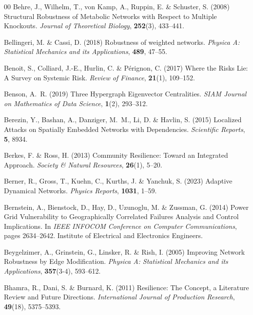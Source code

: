 \documentclass{comnet-mod}
\begin{document}
\begin{thebibliography}{00}
Behre, J., Wilhelm, T., {von Kamp}, A., Ruppin, E. {\&} Schuster, S. (2008)
  {Structural Robustness of Metabolic Networks with Respect to Multiple
  Knockouts}. {\em {Journal of Theoretical Biology}}, \textbf{252}(3),
  433--441.

Bellingeri, M. {\&} Cassi, D. (2018)  Robustness of weighted networks. {\em
  {Physica A: Statistical Mechanics and its Applications}}, \textbf{489},
  47--55.

Benoit, S., Colliard, J.-E., Hurlin, C. {\&} P{\'e}rignon, C. (2017)  {Where
  the Risks Lie: {{A}} Survey on Systemic Risk}. {\em {Review of Finance}},
  \textbf{21}(1), 109--152.

Benson, A.~R. (2019)  {Three Hypergraph Eigenvector Centralities}. {\em {SIAM
  Journal on Mathematics of Data Science}}, \textbf{1}(2), 293--312.

Berezin, Y., Bashan, A., Danziger, M.~M., Li, D. {\&} Havlin, S. (2015)
  {Localized Attacks on Spatially Embedded Networks with Dependencies}. {\em
  {Scientific Reports}}, \textbf{5}, 8934.

Berkes, F. {\&} Ross, H. (2013)  {Community Resilience: {{Toward}} an
  Integrated Approach}. {\em {Society \& Natural Resources}}, \textbf{26}(1),
  5--20.

Berner, R., Gross, T., Kuehn, C., Kurths, J. {\&} Yanchuk, S. (2023)  Adaptive
  Dynamical Networks. {\em {Physics Reports}}, \textbf{1031}, 1--59.

Bernstein, A., Bienstock, D., Hay, D., Uzunoglu, M. {\&} Zussman, G. (2014)
  {Power Grid Vulnerability to Geographically Correlated Failures \textemdash{}
  {{Analysis}} and Control Implications}. In {\em {{{IEEE INFOCOM}} Conference
  on Computer Communications}}, pages 2634--2642. {Institute of Electrical and
  Electronics Engineers}.

Beygelzimer, A., Grinstein, G., Linsker, R. {\&} Rish, I. (2005)  {Improving
  Network Robustness by Edge Modification}. {\em {Physica A: Statistical
  Mechanics and its Applications}}, \textbf{357}(3-4), 593--612.

Bhamra, R., Dani, S. {\&} Burnard, K. (2011)  {Resilience: {{The}} Concept, a
  Literature Review and Future Directions}. {\em {International Journal of
  Production Research}}, \textbf{49}(18), 5375--5393.


\end{thebibliography}
\end{document}
